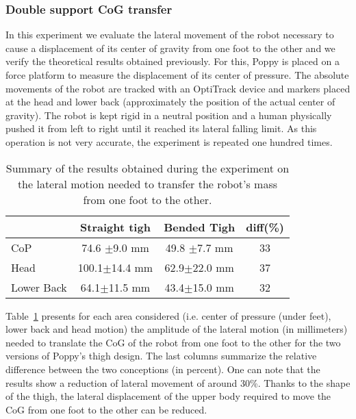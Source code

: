 \subsubsection{Double support CoG transfer} %
\label{sub:cog_motion}


In this experiment we evaluate the lateral movement of the robot necessary to cause a displacement of its center of gravity from one foot to the other and we verify the theoretical results obtained previously. For this, Poppy is placed on a force platform to measure the displacement of its center of pressure. The absolute movements of the robot are tracked with an OptiTrack device and markers placed at the head and lower back (approximately the position of the actual center of gravity). The robot is kept rigid in a neutral position and a human physically pushed it from left to right until it reached its lateral falling limit. As this operation is not very accurate, the experiment is repeated one hundred times.

\begin{table}[h]
\centering
\begin{tabular}{|l|c|c|c|}
  \hline &      Straight tigh &                     Bended Tigh &                   diff(\%) \\
  \hline CoP & 74.6 {\scriptsize$\pm$9.0} mm &     49.8 {\scriptsize$\pm$7.7} mm & 33\\
  Head & 100.1{\scriptsize$\pm$14.4} mm&     62.9{\scriptsize$\pm$22.0} mm &  37\\
  Lower Back & 64.1{\scriptsize$\pm$11.5} mm&      43.4{\scriptsize$\pm$15.0} mm &  32 \\
  \hline
\end{tabular}
\caption{Summary of the results obtained during the experiment on the lateral motion needed to transfer the robot’s mass from one foot to the other.}
\label{tab:CoG_motion}
\end{table}

Table~\ref{tab:CoG_motion} presents for each area considered (i.e. center of pressure (under feet), lower back and head motion) the amplitude of the lateral motion (in millimeters) needed to translate the CoG of the robot from one foot to the other for the two versions of Poppy’s thigh design. The last columns summarize the relative difference between the two conceptions (in percent). One can note that the results show a reduction of lateral movement of around 30\%. Thanks to the shape of the thigh, the lateral displacement of the upper body required to move the CoG from one foot to the other can be reduced.


